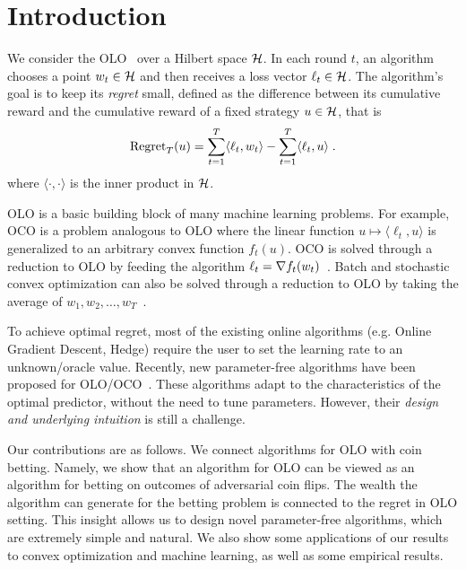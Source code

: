 \section{Introduction}
\label{section:introduction}

We consider the \ac{OLO}~\citep{Cesa-Bianchi-Lugosi-2006, Shalev-Shwartz-2011}
over a Hilbert space $\mathcal{H}$. In each round $t$, an algorithm chooses a point $w_t
\in \mathcal{H}$ and then receives a loss vector $\ell_t \in \mathcal{H}$. The algorithm's goal is
to keep its \emph{regret} small, defined as the difference between its
cumulative reward and the cumulative reward of a fixed strategy $u \in \mathcal{H}$,
that is
\[
\operatorname{Regret}_T(u) = \sum_{t=1}^T \langle \ell_t, w_t \rangle - \sum_{t=1}^T \langle \ell_t, u \rangle  \; .
\]
where $\langle \cdot, \cdot \rangle$ is the inner product in $\mathcal{H}$.

\ac{OLO} is a basic building block of many machine learning problems. For
example, \ac{OCO} is a problem analogous to \ac{OLO} where
the linear function $u \mapsto \langle \ell_t, u \rangle$
is generalized to an arbitrary convex function $f_t(u)$. \ac{OCO} is solved
through a reduction to \ac{OLO} by feeding the algorithm $\ell_t = \nabla
f_t(w_t)$~\citep{Shalev-Shwartz-2011}.  Batch and stochastic convex
optimization can also be solved through a reduction to \ac{OLO} by
taking the average of $w_1, w_2, \dots, w_T$~\citep{Shalev-Shwartz-2011}.

To achieve optimal regret, most of the existing online algorithms (e.g.  Online
Gradient Descent, Hedge) require the user to set the learning rate to an
unknown/oracle value. Recently, new parameter-free algorithms have been
proposed for \ac{OLO}/\ac{OCO}~\citep{Chaudhuri-Freund-Hsu-2009,
Chernov-Vovk-2010, Streeter-McMahan-2012, Orabona-2013, McMahan-Abernethy-2013,
McMahan-Orabona-2014, Luo-Schapire-2014, Orabona-2014, Luo-Schapire-2015, Koolen-van-Erven-2015}.  These algorithms adapt to the characteristics of the
optimal predictor, without the need to tune parameters. However, their
\emph{design and underlying intuition} is still a challenge.

Our contributions are as follows. We connect algorithms for \ac{OLO} with coin
betting. Namely, we show that an algorithm for \ac{OLO} can be viewed as an
algorithm for betting on outcomes of adversarial coin flips. The wealth the
algorithm can generate for the betting problem is connected to the regret in
\ac{OLO} setting. This insight allows us to design novel parameter-free
algorithms, which are extremely simple and natural. We also show some
applications of our results to convex optimization and machine learning, as well as some empirical results.